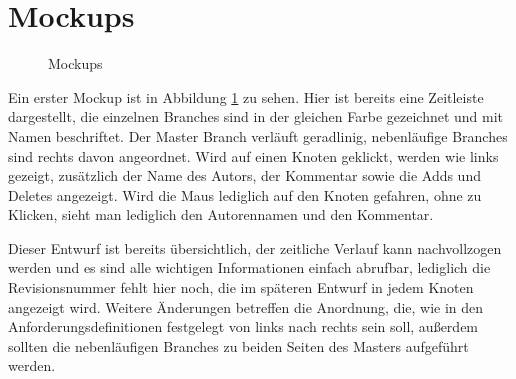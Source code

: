 \documentclass[nocolor]{tudbook}
\begin{document}
\section{Mockups}
\begin{figure}
\caption{Mockups}
\label{fig:mockup1}
\end{figure}

Ein erster Mockup ist in Abbildung \ref{fig:mockup1} zu sehen. Hier ist bereits eine Zeitleiste dargestellt, die einzelnen Branches sind in der gleichen Farbe gezeichnet und mit Namen beschriftet. Der Master Branch verläuft geradlinig, nebenläufige Branches sind rechts davon angeordnet. Wird auf einen Knoten geklickt, werden wie links gezeigt, zusätzlich der Name des Autors, der Kommentar sowie die Adds und Deletes angezeigt. Wird die Maus lediglich auf den Knoten gefahren, ohne zu Klicken, sieht man lediglich den Autorennamen und den Kommentar. 

Dieser Entwurf ist bereits übersichtlich, der zeitliche Verlauf kann nachvollzogen werden und es sind alle wichtigen Informationen einfach abrufbar, lediglich die Revisionsnummer fehlt hier noch, die im späteren Entwurf in jedem Knoten angezeigt wird. Weitere Änderungen betreffen die Anordnung, die, wie in den Anforderungsdefinitionen festgelegt von links nach rechts sein soll, außerdem sollten die nebenläufigen Branches zu beiden Seiten des Masters aufgeführt werden.
\end{document}
